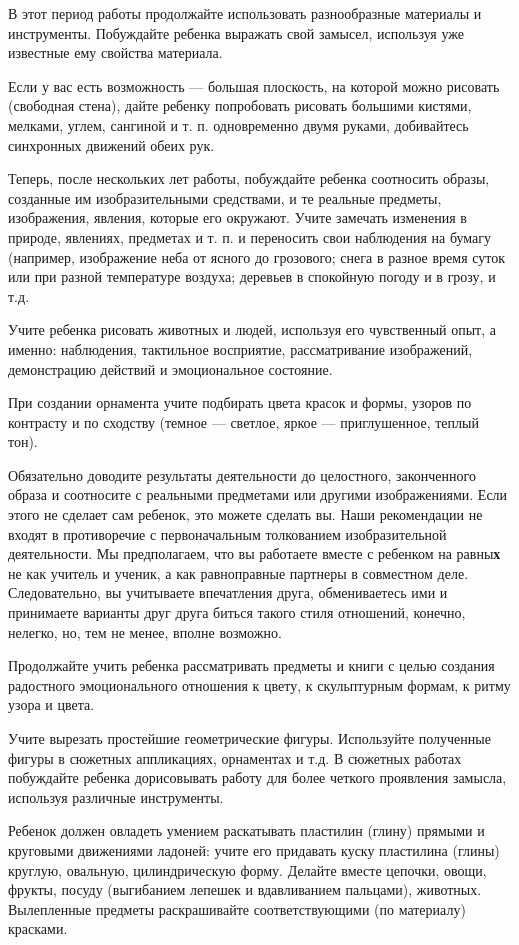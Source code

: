 \documentclass[a5paper]{book}
\begin{document}
В этот период работы продолжайте использовать разнообразные материалы и
инструменты. Побуждайте ребенка выражать свой замысел, используя уже
известные ему свойства материала.

Если у вас есть возможность --- большая плоскость, на которой можно
рисовать (свободная стена), дайте ребенку попробовать рисовать большими
кистями, мелками, углем, сангиной и т. п. одновременно двумя руками,
добивайтесь синхронных движений обеих рук.

Теперь, после нескольких лет работы, побуждайте ребенка соотносить
образы, созданные им изобразительными средствами, и те реальные
предметы, изображения, явления, которые его окружают. Учите замечать
изменения в природе, явлениях, предметах и т. п. и переносить свои
наблюдения на бумагу (например, изображение неба от ясного до грозового;
снега в разное время суток или при разной температуре воздуха; деревьев
в спокойную погоду и в грозу, и т.д.

Учите ребенка рисовать животных и людей, используя его чувственный опыт,
а именно: наблюдения, тактильное восприятие, рассматривание изображений,
демонстрацию действий и эмоциональное состояние.

При создании орнамента учите подбирать цвета красок и формы, узоров по
контрасту и по сходству (темное --- светлое, яркое --- приглушенное,
теплый тон).

Обязательно доводите результаты деятельности до целостного, законченного
образа и соотносите с реальными предметами или другими изображениями.
Если этого не сделает сам ребенок, это можете сделать вы. Наши
рекомендации не входят в противоречие с первоначальным толкованием
изобразительной деятельности. Мы предполагаем, что вы работаете вместе с
ребенком на равны\textbf{х} не как учитель и ученик, а как равноправные
партнеры в совместном деле. Следовательно, вы учитываете впечатления
друга, обмениваетесь ими и принимаете варианты друг друга биться такого
стиля отношений, конечно, нелегко, но, тем не менее, вполне возможно.

Продолжайте учить ребенка рассматривать предметы и книги с целью
создания радостного эмоционального отношения к цвету, к скульптурным
формам, к ритму узора и цвета.

Учите вырезать простейшие геометрические фигуры. Используйте полученные
фигуры в сюжетных аппликациях, орнаментах и т.д. В сюжетных работах
побуждайте ребенка дорисовывать работу для более четкого проявления
замысла, используя различные инструменты.

Ребенок должен овладеть умением раскатывать пластилин (глину) прямыми и
круговыми движениями ладоней: учите его придавать куску пластилина
(глины) круглую, овальную, цилиндрическую форму. Делайте вместе цепочки,
овощи, фрукты, посуду (выгибанием лепешек и вдавливанием пальцами),
животных. Вылепленные предметы раскрашивайте соответствующими (по
материалу) красками.
\end{document}

